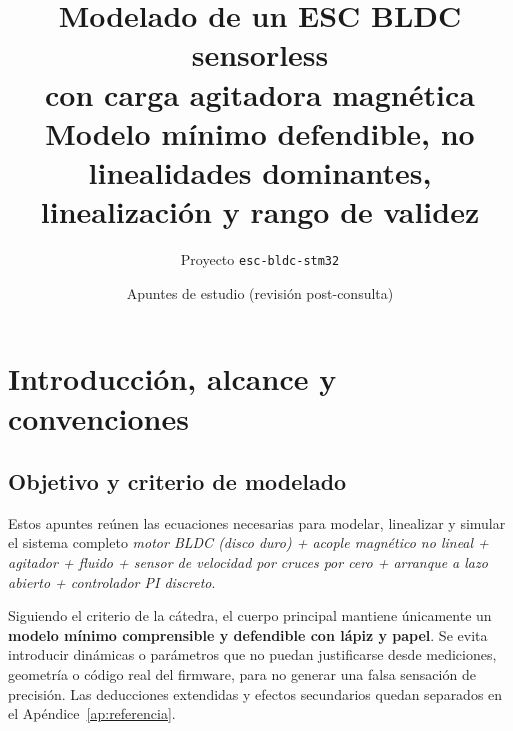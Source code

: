 \documentclass[11pt,a4paper,oneside]{report}
\title{\textbf{Modelado de un ESC BLDC sensorless\\ con carga agitadora magnética}\\[0.5em]
\large Modelo mínimo defendible, no linealidades dominantes,\\
linealización y rango de validez}
\author{Proyecto \texttt{esc-bldc-stm32}}
\date{Apuntes de estudio (revisión post-consulta)}
\theoremstyle{definition}
\theoremstyle{remark}
\begin{document}
\hypersetup{pageanchor=false}
\maketitle
\hypersetup{pageanchor=true}
\tableofcontents

\chapter{Introducción, alcance y convenciones}

\section{Objetivo y criterio de modelado}
Estos apuntes reúnen las ecuaciones necesarias para modelar, linealizar y simular
el sistema completo \emph{motor BLDC (disco duro) + acople magnético no lineal
+ agitador + fluido + sensor de velocidad por cruces por cero + arranque a lazo
abierto + controlador PI discreto}.

Siguiendo el criterio de la cátedra, el cuerpo principal mantiene únicamente un
\textbf{modelo mínimo comprensible y defendible con lápiz y papel}. Se evita
introducir dinámicas o parámetros que no puedan justificarse desde mediciones,
geometría o código real del firmware, para no generar una falsa sensación de
precisión. Las deducciones extendidas y efectos secundarios quedan separados en
el Apéndice~\ref{ap:referencia}.
\end{document}
